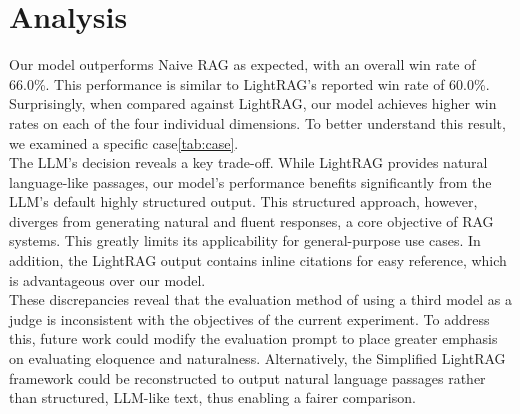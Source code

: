 \documentclass{article}
\begin{document}
    \newpage

\section{Analysis}
    Our model outperforms Naive RAG as expected, with an overall win rate of 66.0\%. 
    This performance is similar to LightRAG's reported win rate of 60.0\%. 
    Surprisingly, when compared against LightRAG,
    our model achieves higher win rates on each of the four individual dimensions.
    To better understand this result, we examined a specific case\ref{tab:case}.\\

    The LLM's decision reveals a key trade-off.
    While LightRAG provides natural language-like passages, 
    our model's performance benefits significantly from the LLM's default highly structured output. 
    This structured approach, however, diverges from generating natural and fluent responses, 
    a core objective of RAG systems.
    This greatly limits its applicability for general-purpose use cases.
    In addition, the LightRAG output contains inline citations for easy reference,
    which is advantageous over our model.\\

    These discrepancies reveal that the evaluation method of using a third model as a judge is inconsistent 
    with the objectives of the current experiment. 
    To address this, future work could modify the evaluation prompt to place greater emphasis on evaluating eloquence and naturalness. 
    Alternatively, the Simplified LightRAG framework could be reconstructed to output natural language passages 
    rather than structured, LLM-like text, thus enabling a fairer comparison.



\end{document}
